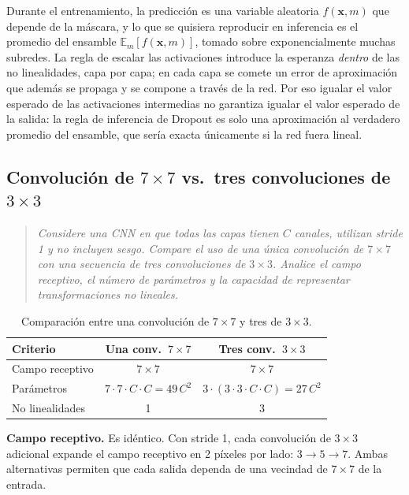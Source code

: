 \documentclass[12pt, a4paper]{article}
\newenvironment{enunciado}
  {\begin{quote}\itshape\color{black!75}}
  {\end{quote}}
\begin{document}
Durante el entrenamiento, la predicción es una variable aleatoria $f(\mathbf{x}, m)$ que
depende de la máscara, y lo que se quisiera reproducir en inferencia es el promedio del
ensamble $\mathbb{E}_m[f(\mathbf{x}, m)]$, tomado sobre exponencialmente muchas subredes.
La regla de escalar las activaciones introduce la esperanza \emph{dentro} de las no
linealidades, capa por capa; en cada capa se comete un error de aproximación que además se
propaga y se compone a través de la red. Por eso igualar el valor esperado de las
activaciones intermedias no garantiza igualar el valor esperado de la salida: la regla de
inferencia de Dropout es solo una aproximación al verdadero promedio del ensamble, que
sería exacta únicamente si la red fuera lineal.

\subsection{Convolución de $7\times 7$ vs.\ tres convoluciones de $3\times 3$}

\begin{enunciado}
Considere una CNN en que todas las capas tienen $C$ canales, utilizan stride 1 y no incluyen
sesgo. Compare el uso de una única convolución de $7\times 7$ con una secuencia de tres
convoluciones de $3\times 3$. Analice el campo receptivo, el número de parámetros y la
capacidad de representar transformaciones no lineales.
\end{enunciado}

\begin{table}[H]
\centering
\caption{Comparación entre una convolución de $7\times 7$ y tres de $3\times 3$.}
\begin{tabular}{@{}lcc@{}}
\toprule
\textbf{Criterio} & \textbf{Una conv.\ $7\times 7$} & \textbf{Tres conv.\ $3\times 3$} \\
\midrule
Campo receptivo   & $7\times 7$ & $7\times 7$ \\
Parámetros        & $7\cdot 7\cdot C\cdot C = 49\,C^2$ & $3\cdot(3\cdot 3\cdot C\cdot C) = 27\,C^2$ \\
No linealidades   & 1 & 3 \\
\bottomrule
\end{tabular}
\end{table}

\textbf{Campo receptivo.} Es idéntico. Con stride 1, cada convolución de $3\times 3$
adicional expande el campo receptivo en 2 píxeles por lado: $3 \to 5 \to 7$. Ambas
alternativas permiten que cada salida dependa de una vecindad de $7\times 7$ de la entrada.
\end{document}
